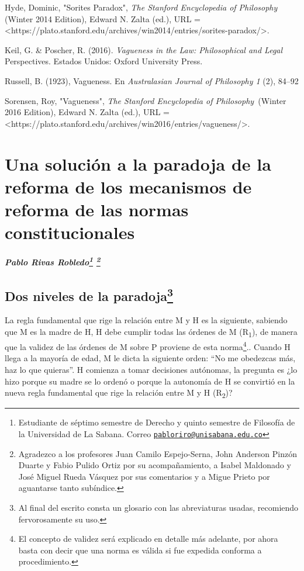 \documentclass[]{book}
\newcommand{\autor}[1]{            %
  \begin{center}                   %
    \vspace*{-3.5em}               %
    \textbf{\textit{\large #1}}    %
    \vspace*{+4em}                 %
  \end{center}
}
\begin{document}
Hyde, Dominic, "Sorites Paradox", \emph{The Stanford Encyclopedia of
Philosophy} (Winter 2014 Edition), Edward N. Zalta (ed.), URL =
\textless{}https://plato.stanford.edu/archives/win2014/entries/sorites-paradox/\textgreater{}.

Keil, G. \& Poscher, R. (2016). \emph{Vagueness in the Law:
Philosophical and Legal} Perspectives. Estados Unidos: Oxford University
Press.

Russell, B. (1923), Vagueness. En \emph{Australasian Journal of
Philosophy 1} (2), 84--92

Sorensen, Roy, "Vagueness", \emph{The Stanford Encyclopedia of
Philosophy~}(Winter 2016 Edition), Edward N. Zalta (ed.), URL =
\textless{}https://plato.stanford.edu/archives/win2016/entries/vagueness/\textgreater{}.

\chapter{\texorpdfstring{\textbf{Una solución a la paradoja de la
reforma de los mecanismos de reforma de las normas
constitucionales}}{Una solución a la paradoja de la reforma de los mecanismos de reforma de las normas constitucionales}}\label{una-soluciuxf3n-a-la-paradoja-de-la-reforma-de-los-mecanismos-de-reforma-de-las-normas-constitucionales}

\autor{Pablo Rivas Robledo\footnote{Estudiante de séptimo semestre de
  Derecho y quinto semestre de Filosofía de la Universidad de La Sabana.
  Correo
  \href{mailto:pabloriro@unisabana.edu.co}{\nolinkurl{pabloriro@unisabana.edu.co}}} \footnote{Agradezco a los profesores Juan Camilo Espejo-Serna, John Anderson Pinzón Duarte y Fabio Pulido Ortiz por su acompañamiento, a Isabel Maldonado y José Miguel Rueda Vásquez por sus comentarios y a Migue Prieto por aguantarse tanto subíndice.}}

\section*{Dos niveles de la paradoja\footnote{Al final del escrito consta
		un glosario con las abreviaturas usadas, recomiendo fervorosamente su
		uso.}}

La regla fundamental que rige la relación entre M y H es la siguiente,
sabiendo que M es la madre de H, H debe cumplir todas las órdenes de M
(R\textsubscript{1}), de manera que la validez de las órdenes de M sobre
P proviene de esta norma\footnote{El concepto de validez será explicado
  en detalle más adelante, por ahora basta con decir que una norma es
  válida si fue expedida conforma a procedimiento.}.. Cuando H llega a
la mayoría de edad, M le dicta la siguiente orden: ``No me obedezcas
más, haz lo que quieras''. H comienza a tomar decisiones autónomas, la
pregunta es ¿lo hizo porque su madre se lo ordenó o porque la autonomía
de H se convirtió en la nueva regla fundamental que rige la relación
entre M y H (R\textsubscript{2})?
\end{document}
